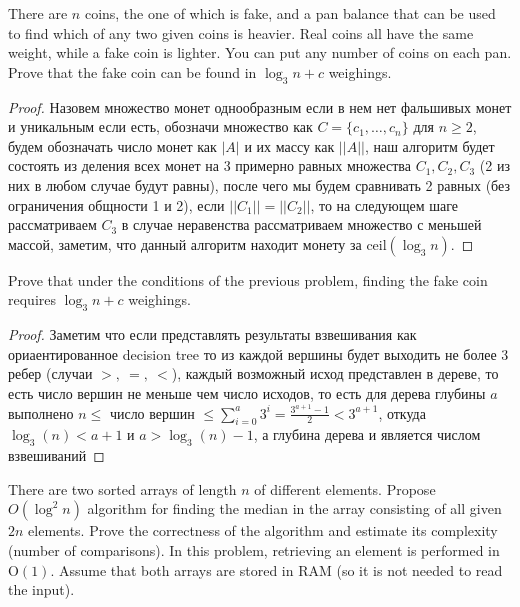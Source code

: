 \begin{prob}
There are $n$ coins, the one of which is fake, and a pan balance that can be used to find which of any two given coins is heavier. Real coins all have the same weight, while a fake coin is lighter. You can put any number of coins on each pan. Prove that the fake coin can be found in $\log_3 n+c$ weighings.
\end{prob}

\begin{proof}
Назовем множество монет однообразным если в нем нет фальшивых монет и уникальным если есть, обозначи множество как $C = \{c_1, \ldots, c_n\}$ для $n \geq 2$, будем обозначать число монет как $|A|$ и их массу как $||A||$, наш алгоритм будет состоять из деления всех монет на 3 примерно равных множества $C_1, C_2, C_3$ (2 из них в любом случае будут равны), после чего мы будем сравнивать 2 равных (без ограничения общности 1 и 2), если $||C_1|| = ||C_2||$, то на следующем шаге рассматриваем $C_3$ в случае неравенства рассматриваем множество с меньшей массой, заметим, что данный алгоритм находит монету за $\text{ceil}(\log_3 n)$.
\end{proof}
\vskip 0.6in



\begin{prob}
Prove that under the conditions of the previous problem, finding the fake coin requires $\log _3 n+c$ weighings.
\end{prob}

\begin{proof}
Заметим что если представлять результаты взвешивания как ориаентированное decision tree то из каждой вершины будет выходить не более 3 ребер (случаи $>,\ =,\ <$), каждый возможный исход представлен в дереве, то есть число вершин не меньше чем число исходов, то есть для дерева глубины $a$ выполнено $n \leq \text{ число вершин } \leq \sum\limits_{i = 0}^{a} 3^i = \frac{3^{a+1} - 1}{2} < 3^{a+1}$, откуда $\log_3(n) < a+1$ и $a > \log_3(n) - 1$, а глубина дерева и является числом взвешиваний
\end{proof}
\vskip 0.6in



\begin{prob}
There are two sorted arrays of length $n$ of different elements. Propose $O\left(\log ^2 n\right)$ algorithm for finding the median in the array consisting of all given $2 n$ elements. Prove the correctness of the algorithm and estimate its complexity (number of comparisons). In this problem, retrieving an element is performed in $\mathrm{O}(1)$. Assume that both arrays are stored in RAM (so it is not needed to read the input).
\end{prob}

